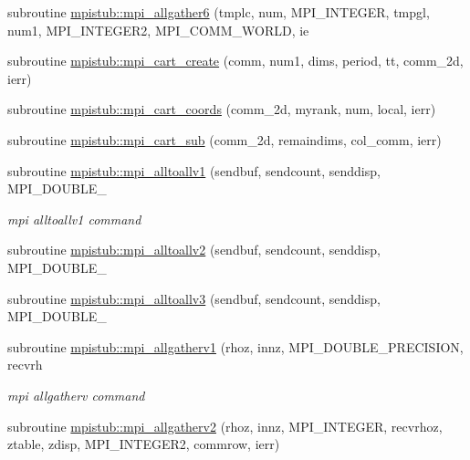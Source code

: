 \begin{DoxyCompactItemize}
\item 
subroutine \mbox{\hyperlink{namespacempistub_ace33f6f5c0cff4120ef8d624a20adf59}{mpistub\+::mpi\+\_\+allgather6}} (tmplc, num, M\+P\+I\+\_\+\+I\+N\+T\+E\+G\+ER, tmpgl, num1, M\+P\+I\+\_\+\+I\+N\+T\+E\+G\+E\+R2, M\+P\+I\+\_\+\+C\+O\+M\+M\+\_\+\+W\+O\+R\+LD, ie
\item 
subroutine \mbox{\hyperlink{namespacempistub_ae0b8402fe840a321a5e4eabbda8ecb43}{mpistub\+::mpi\+\_\+cart\+\_\+create}} (comm, num1, dims, period, tt, comm\+\_\+2d, ierr)
\item 
subroutine \mbox{\hyperlink{namespacempistub_a599bb38fd4a9f405ced50d48c09116ca}{mpistub\+::mpi\+\_\+cart\+\_\+coords}} (comm\+\_\+2d, myrank, num, local, ierr)
\item 
subroutine \mbox{\hyperlink{namespacempistub_ab9ac48f74bbcdf05669e63852a220c09}{mpistub\+::mpi\+\_\+cart\+\_\+sub}} (comm\+\_\+2d, remaindims, col\+\_\+comm, ierr)
\item 
subroutine \mbox{\hyperlink{namespacempistub_aa93ced1f07150fe7c8d11a35a0b77b1f}{mpistub\+::mpi\+\_\+alltoallv1}} (sendbuf, sendcount, senddisp, M\+P\+I\+\_\+\+D\+O\+U\+B\+L\+E\+\_\+
\begin{DoxyCompactList}\small\item\em mpi alltoallv1 command \end{DoxyCompactList}\item 
subroutine \mbox{\hyperlink{namespacempistub_ac85c372d1990a0cfd2b6cb31a0be0b47}{mpistub\+::mpi\+\_\+alltoallv2}} (sendbuf, sendcount, senddisp, M\+P\+I\+\_\+\+D\+O\+U\+B\+L\+E\+\_\+
\item 
subroutine \mbox{\hyperlink{namespacempistub_a9e2b2b4a1d6bda704e33a2acfcfb9cfd}{mpistub\+::mpi\+\_\+alltoallv3}} (sendbuf, sendcount, senddisp, M\+P\+I\+\_\+\+D\+O\+U\+B\+L\+E\+\_\+
\item 
subroutine \mbox{\hyperlink{namespacempistub_a35fa927935bbf54e76460692ed2ae189}{mpistub\+::mpi\+\_\+allgatherv1}} (rhoz, innz, M\+P\+I\+\_\+\+D\+O\+U\+B\+L\+E\+\_\+\+P\+R\+E\+C\+I\+S\+I\+ON, recvrh
\begin{DoxyCompactList}\small\item\em mpi allgatherv command \end{DoxyCompactList}\item 
subroutine \mbox{\hyperlink{namespacempistub_a107fe42e9088982af86dbfe11fe0ac33}{mpistub\+::mpi\+\_\+allgatherv2}} (rhoz, innz, M\+P\+I\+\_\+\+I\+N\+T\+E\+G\+ER, recvrhoz, ztable, zdisp, M\+P\+I\+\_\+\+I\+N\+T\+E\+G\+E\+R2, commrow, ierr)
\end{DoxyCompactItemize}
